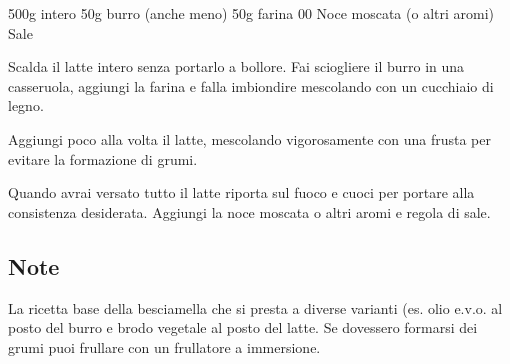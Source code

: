 \label{besciamella}
\serves{-}%
\begin{ingreds}
	500g  intero
	50g burro (anche meno)
	50g farina 00
	Noce moscata (o altri aromi)
	Sale


\end{ingreds}

\begin{method}
Scalda il latte intero senza portarlo a bollore. Fai sciogliere il burro in una casseruola, aggiungi la farina e falla imbiondire mescolando con un cucchiaio di legno.

Aggiungi poco alla volta il latte, mescolando vigorosamente con una frusta per evitare la formazione di grumi.

Quando avrai versato tutto il latte riporta sul fuoco e cuoci per portare alla consistenza desiderata. Aggiungi la noce moscata o altri aromi e regola di sale.

\end{method}

\subsection*{Note}
La ricetta base della besciamella che si presta a diverse varianti (es. olio e.v.o. al posto del burro e brodo vegetale al posto del latte. Se dovessero formarsi dei grumi puoi frullare con un frullatore a immersione.



